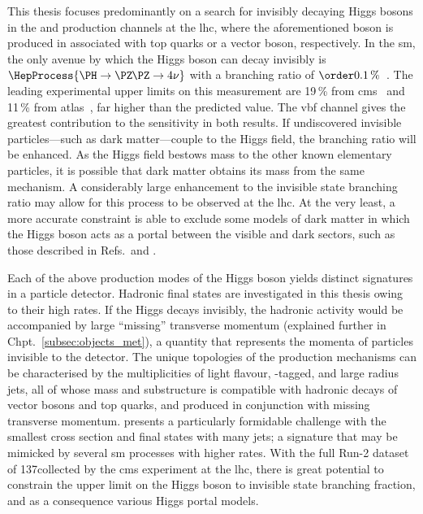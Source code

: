 This thesis focuses predominantly on a search for invisibly decaying Higgs bosons in the \ttH and \VH production channels at the \acrshort{lhc}, where the aforementioned boson is produced in associated with top quarks or a vector boson, respectively. In the \acrlong{sm}, the only avenue by which the Higgs boson can decay invisibly is $\HepProcess{\PH \to \PZ\mkern-1mu\PZ \to \text{4}\nu}$ with a branching ratio of $\order{\text{0.1\,\%}}$~\cite{Heinemeyer:1559921}. The leading experimental upper limits on this measurement are 19\,\% from \acrshort{cms}~\cite{Sirunyan:2018owy} and 11\,\% from \acrshort{atlas}~\cite{ATLAS:2020kdi}, far higher than the predicted value. The \acrfull{vbf} channel gives the greatest contribution to the sensitivity in both results. If undiscovered invisible particles---such as dark matter---couple to the Higgs field, the branching ratio will be enhanced. As the Higgs field bestows mass to the other known elementary particles, it is possible that dark matter obtains its mass from the same mechanism. A considerably large enhancement to the invisible state branching ratio may allow for this process to be observed at the \acrshort{lhc}. At the very least, a more accurate constraint is able to exclude some models of dark matter in which the Higgs boson acts as a portal between the visible and dark sectors, such as those described in Refs.~and .

Each of the above production modes of the Higgs boson yields distinct signatures in a particle detector. Hadronic final states are investigated in this thesis owing to their high rates. If the Higgs decays invisibly, the hadronic activity would be accompanied by large ``missing'' transverse momentum (explained further in Chpt.~\ref{subsec:objects_met}), a quantity that represents the momenta of particles invisible to the detector. The unique topologies of the production mechanisms can be characterised by the multiplicities of light flavour, \Pqb-tagged, and large radius \glspl{jet}, all of whose mass and substructure is compatible with hadronic decays of vector bosons and top quarks, and produced in conjunction with missing transverse momentum. \ttH presents a particularly formidable challenge with the smallest cross section and final states with many \glspl{jet}; a signature that may be mimicked by several \acrshort{sm} processes with higher rates. With the full Run-2 dataset of 137\fbinv collected by the \acrshort{cms} experiment at the \acrshort{lhc}, there is great potential to constrain the upper limit on the Higgs boson to invisible state branching fraction, and as a consequence various Higgs portal models.

